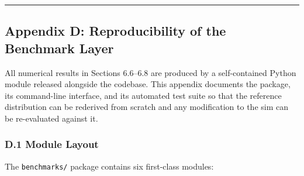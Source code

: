 \documentclass[
]{article}
\begin{document}
\begin{center}\rule{0.5\linewidth}{0.5pt}\end{center}

\subsection{Appendix D: Reproducibility of the Benchmark
Layer}\label{appendix-d-reproducibility-of-the-benchmark-layer}

All numerical results in Sections 6.6--6.8 are produced by a
self-contained Python module released alongside the codebase. This
appendix documents the package, its command-line interface, and its
automated test suite so that the reference distribution can be rederived
from scratch and any modification to the sim can be re-evaluated against
it.

\subsubsection{D.1 Module Layout}\label{d.1-module-layout}

The \texttt{benchmarks/} package contains six first-class modules:
\end{document}

